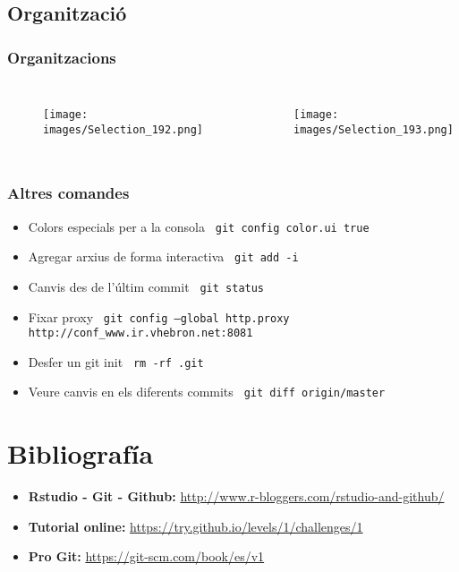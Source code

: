 \documentclass{beamer}
\newcommand{\shellcmd}[1]{{\color{blue}\indent\indent\texttt{\footnotesize\ #1}\\}}
\begin{document}
\subsection{Organitzaci\'o}
\begin{frame}
	\frametitle{Organitzacions}
	\begin{columns}[c] %
		
			\begin{figure}
				\texttt{[image: images/Selection\_192.png]}
			\end{figure}
		
		
			\begin{figure}
				\texttt{[image: images/Selection\_193.png]}
			\end{figure}
	
	\end{columns}
\end{frame}



\begin{frame}
	\frametitle{Altres comandes}
	\begin{itemize}
		\item Colors especials per a la consola \shellcmd{git config color.ui true}
		\item Agregar arxius de forma interactiva  \shellcmd{git add -i}
		\item Canvis des de l'\'ultim commit \shellcmd{git status}
		\item Fixar proxy \shellcmd{git config --global http.proxy http://conf\_www.ir.vhebron.net:8081}
		\item Desfer un git init \shellcmd{rm -rf .git}
		\item Veure canvis en els diferents commits \shellcmd{git diff origin/master}
	\end{itemize}
\end{frame}

\section{Bibliograf\'ia}
\begin{frame}
	\begin{itemize}
		\item \textbf{Rstudio - Git - Github:} \url{http://www.r-bloggers.com/rstudio-and-github/}
		\item \textbf{Tutorial online: } \url{https://try.github.io/levels/1/challenges/1}
		\item \textbf{Pro Git:} \url{https://git-scm.com/book/es/v1}
	\end{itemize}
\end{frame}
\end{document}
